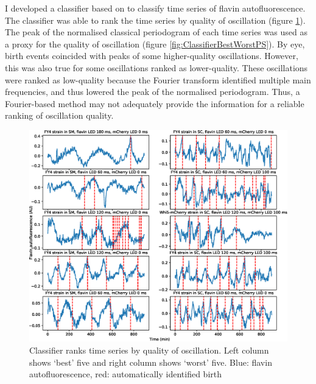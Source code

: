 I developed a classifier based on \citet{glynnDetectingPeriodicPatterns2006} to classify time series of flavin autofluorescence.
The classifier was able to rank the time series by quality of oscillation (figure \ref{fig:ClassifierBestWorstTS}).
The peak of the normalised classical periodogram of each time series was used as a proxy for the quality of oscillation (figure \ref{fig:ClassifierBestWorstPS}).
By eye, birth events coincided with peaks of some higher-quality oscillations.
However, this was also true for some oscillations ranked as lower-quality.
These oscillations were ranked as low-quality because the Fourier transform identified multiple main frequencies, and thus lowered the peak of the normalised periodogram.
Thus, a Fourier-based method may not adequately provide the information for a reliable ranking of oscillation quality.

\begin{figure}[htbp]
  \centering
  \includegraphics[width=\textwidth]{10m_ClassifierBestWorstTS}
  \caption{Classifier ranks time series by quality of oscillation.
    Left column shows `best' five and right column shows `worst' five.
    Blue: flavin autofluorescence, red: automatically identified birth}
  \label{fig:ClassifierBestWorstTS}
\end{figure}

